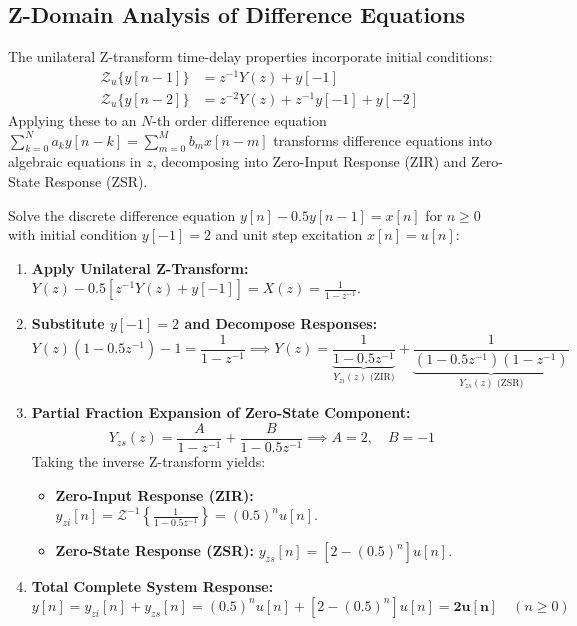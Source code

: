 \documentclass[12pt,a4paper]{article}
\begin{document}
\subsection{Z-Domain Analysis of Difference Equations}
The unilateral Z-transform time-delay properties incorporate initial conditions:
\begin{align}
  \mathcal{Z}_u\{y[n-1]\} &= z^{-1} Y(z) + y[-1] \\
  \mathcal{Z}_u\{y[n-2]\} &= z^{-2} Y(z) + z^{-1} y[-1] + y[-2]
\end{align}
Applying these to an $N$-th order difference equation $\sum_{k=0}^N a_k y[n-k] = \sum_{m=0}^M b_m x[n-m]$ transforms difference equations into algebraic equations in $z$, decomposing into Zero-Input Response (ZIR) and Zero-State Response (ZSR).

\begin{tcolorbox}[examplebox, title={\textbf{Worked Example: Complete Response via Unilateral Z-Transform}}]
Solve the discrete difference equation $y[n] - 0.5 y[n-1] = x[n]$ for $n \ge 0$ with initial condition $y[-1] = 2$ and unit step excitation $x[n] = u[n]$:
\begin{enumerate}[label=\textbf{Step \arabic*:}, leftmargin=*, itemsep=2pt]
  \item \textbf{Apply Unilateral Z-Transform:}
  $Y(z) - 0.5 [z^{-1} Y(z) + y[-1]] = X(z) = \frac{1}{1 - z^{-1}}$.
  \item \textbf{Substitute $y[-1] = 2$ and Decompose Responses:}
  \begin{equation*}
    Y(z)(1 - 0.5 z^{-1}) - 1 = \frac{1}{1 - z^{-1}} \implies Y(z) = \underbrace{\frac{1}{1 - 0.5 z^{-1}}}_{Y_{zi}(z) \text{ (ZIR)}} + \underbrace{\frac{1}{(1 - 0.5 z^{-1})(1 - z^{-1})}}_{Y_{zs}(z) \text{ (ZSR)}}
  \end{equation*}
  \item \textbf{Partial Fraction Expansion of Zero-State Component:}
  \begin{equation*}
    Y_{zs}(z) = \frac{A}{1 - z^{-1}} + \frac{B}{1 - 0.5 z^{-1}} \implies A = 2, \quad B = -1
  \end{equation*}
  Taking the inverse Z-transform yields:
  \begin{itemize}[itemsep=1pt]
    \item \textbf{Zero-Input Response (ZIR):} $y_{zi}[n] = \mathcal{Z}^{-1}\left\{ \frac{1}{1 - 0.5 z^{-1}} \right\} = (0.5)^n u[n]$.
    \item \textbf{Zero-State Response (ZSR):} $y_{zs}[n] = \left[ 2 - (0.5)^n \right] u[n]$.
  \end{itemize}
  \item \textbf{Total Complete System Response:}
  \begin{equation*}
    y[n] = y_{zi}[n] + y_{zs}[n] = (0.5)^n u[n] + \left[ 2 - (0.5)^n \right] u[n] = \mathbf{2 u[n]} \quad (n \ge 0)
  \end{equation*}
\end{enumerate}
\end{tcolorbox}
\end{document}
